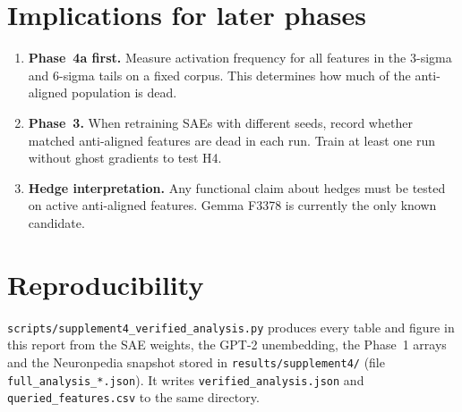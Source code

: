 \documentclass[11pt,a4paper]{article}
\begin{document}
\section{Implications for later phases}

\begin{enumerate}[noitemsep]
  \item \textbf{Phase~4a first.} Measure activation frequency for all features in the 3-sigma and 6-sigma tails on a fixed corpus. This determines how much of the anti-aligned population is dead.
  \item \textbf{Phase~3.} When retraining SAEs with different seeds, record whether matched anti-aligned features are dead in each run. Train at least one run without ghost gradients to test H4.
  \item \textbf{Hedge interpretation.} Any functional claim about hedges must be tested on active anti-aligned features. Gemma F3378 is currently the only known candidate.
\end{enumerate}

\section*{Reproducibility}

\nolinkurl{scripts/supplement4_verified_analysis.py} produces every table and figure in this report from the SAE weights, the GPT-2 unembedding, the Phase~1 arrays and the Neuronpedia snapshot stored in \nolinkurl{results/supplement4/} (file \nolinkurl{full_analysis_*.json}). It writes \nolinkurl{verified_analysis.json} and \nolinkurl{queried_features.csv} to the same directory.



\end{document}
